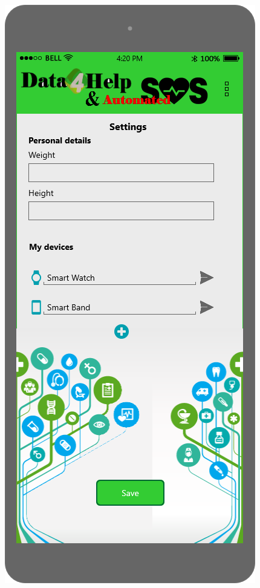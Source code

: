 \begin{figure}[h!]
	\centering
 	\begin{minipage}[b]{0.25\textwidth}
    		\includegraphics[width=\textwidth]{./pictures/settings.png}

\end{minipage}
\end{figure}
